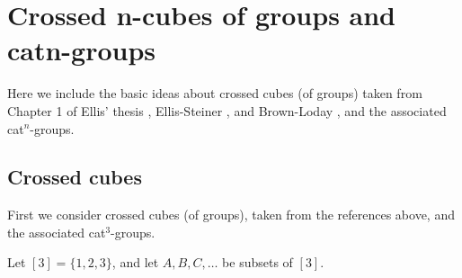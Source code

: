 

\section{Crossed n-cubes of groups and catn-groups}

\noindent
Here we include the basic ideas about crossed cubes (of groups)
taken from Chapter 1 of Ellis' thesis \cite{ellis-thesis},
Ellis-Steiner \cite{ell:st}, and Brown-Loday \cite{brow:lod}, 
and the associated cat$^n$-groups.

\subsection{Crossed cubes}\label{sect:xcube}

\noindent {} 
First we consider crossed cubes (of groups), 
taken from the references above, 
and the associated cat$^3$-groups.

\noindent\bigskip
Let $[3] = \{1,2,3\}$, and let $A,B,C,\ldots$ be subsets of $[3]$.

